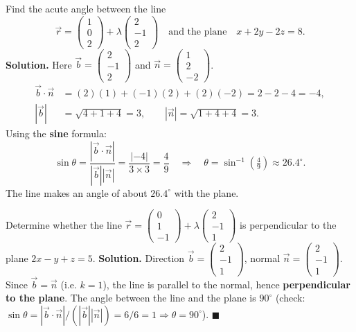 \documentclass[11pt]{article}
\begin{document}
\begin{exoresolu}
Find the acute angle between the line
\[
\vec{r}=\begin{pmatrix}1\\0\\2\end{pmatrix}+\lambda\begin{pmatrix}2\\-1\\2\end{pmatrix}
\quad\text{and the plane}\quad
x+2y-2z=8.
\]
\tcblower
\textbf{Solution.} Here $\vec{b}=\begin{pmatrix}2\\-1\\2\end{pmatrix}$ and $\vec{n}=\begin{pmatrix}1\\2\\-2\end{pmatrix}$.
\begin{align*}
\vec{b}\cdot\vec{n} &= (2)(1)+(-1)(2)+(2)(-2)=2-2-4=-4,\\
|\vec{b}|&=\sqrt{4+1+4}=3,\qquad |\vec{n}|=\sqrt{1+4+4}=3.
\end{align*}
Using the \textbf{sine} formula:
\[
\sin\theta=\frac{|\vec{b}\cdot\vec{n}|}{|\vec{b}||\vec{n}|}=\frac{|-4|}{3\times 3}=\frac{4}{9}
\quad\Longrightarrow\quad
\theta=\sin^{-1}\!\left(\tfrac{4}{9}\right)\approx 26.4^\circ.
\]
The line makes an angle of about $26.4^\circ$ with the plane.
\end{exoresolu}

\begin{exoresolu}
Determine whether the line $\vec{r}=\begin{pmatrix}0\\1\\-1\end{pmatrix}+\lambda\begin{pmatrix}2\\-1\\1\end{pmatrix}$ is perpendicular to the plane $2x-y+z=5$.
\tcblower
\textbf{Solution.} Direction $\vec{b}=\begin{pmatrix}2\\-1\\1\end{pmatrix}$, normal $\vec{n}=\begin{pmatrix}2\\-1\\1\end{pmatrix}$. Since $\vec{b}=\vec{n}$ (i.e. $k=1$), the line is parallel to the normal, hence \textbf{perpendicular to the plane}. The angle between the line and the plane is $90^\circ$ (check: $\sin\theta=|\vec{b}\cdot\vec{n}|/(|\vec{b}||\vec{n}|)=6/6=1 \Rightarrow \theta=90^\circ$). $\blacksquare$
\end{exoresolu}
\end{document}
